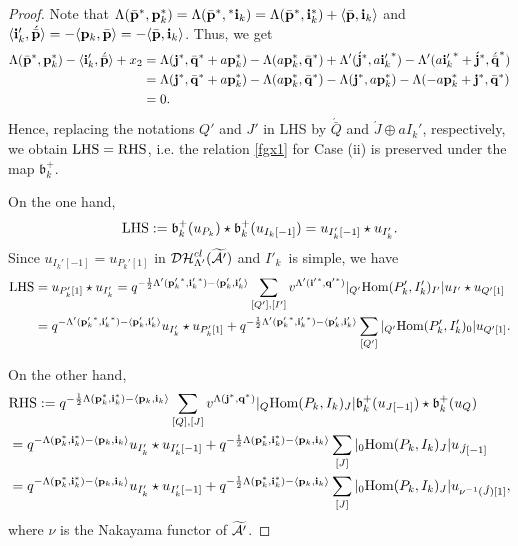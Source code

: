 \documentclass[reqno,12pt]{amsart}
\numberwithin{equation}{section}
\def\lr#1{\langle #1\rangle} \def\fin{\hfill$\square$}  \def\lra{\longrightarrow} \def\mod{\mbox{\rm \textbf{mod}}\,}\def\Mod{\mbox{\rm mod}\,}\def\top{\mbox{\rm top}\,}\def\soc{\mbox{\rm soc}\,}
\theoremstyle{plain} %
\theoremstyle{definition} %
\begin{document}
\begin{proof}
Note that $\Lambda(\bar{\bf p}^\ast, {\bf p}_k^\ast)=\Lambda(\bar{\bf p}^\ast, {^\ast}{\bf i}_k)=\Lambda(\bar{\bf p}^\ast, {\bf i}_k^\ast)+\langle \bar{\bf p},{\bf i}_k\rangle$ and $\langle {\bf i}_k',{\acute{\bar{\bf p}}}\rangle=-\langle {\bf p}_k,\bar{\bf p}\rangle=-\langle \bar{\bf p},{\bf i}_k\rangle$. Thus, we get
\begin{align*}\Lambda(\bar{\bf p}^\ast, {\bf p}_k^\ast)-\langle {\bf i}_k',{\acute{\bar{\bf p}}}\rangle+x_2&=\Lambda({\bf j}^\ast,\bar{\bf q}^\ast+a{\bf p}_k^\ast)-\Lambda(a{\bf p}_k^\ast,\bar{\bf q}^\ast)+\Lambda'({\acute{{\bf j}}}^\ast,a{{\bf i}_k'}^\ast)-\Lambda'(a{{\bf i}_k'}^\ast+{\acute{{\bf j}}}^\ast, {\acute{\bar{\bf q}}}^\ast)\\
&=\Lambda({\bf j}^\ast,\bar{\bf q}^\ast+a{\bf p}_k^\ast)-\Lambda(a{\bf p}_k^\ast,\bar{\bf q}^\ast)-\Lambda({\bf j}^\ast, a{\bf p}_k^\ast)-\Lambda(-a{\bf p}_k^\ast+{\bf j}^\ast,\bar{\bf q}^\ast)\\
	&=0.\end{align*}
Hence, replacing the notations $Q'$ and $J'$ in {\rm LHS} by $\acute{\bar{Q}}$ and $\acute{J}\oplus aI_k'$, respectively,
we obtain
${\rm LHS}={\rm RHS}$, i.e. the relation \eqref{fgx1} for Case (ii) is preserved under the map $\mathfrak{b}_k^+$.

 On the one hand,
$${\rm LHS}:=\mathfrak{b}_k^+(u_{P_k})\star \mathfrak{b}_k^+(u_{I_k[-1]})=u_{I'_k[-1]}\star u_{I_k'}.$$
Since $u_{I_k'[-1]}=u_{P_k'[1]}$ in $\mathcal{DH}_{\Lambda'}^{cl}(\widetilde{\mathcal{A}'})$ and $I'_k$~is simple, we have	
\begin{align*}
{\rm LHS}&=u_{P'_k[1]}\star u_{I_k'}	
=q^{-\frac{1}{2}\Lambda'({{\bf p}_k'}^\ast,{{\bf i}_k'}^\ast)-\lr{{\bf p}'_k,{\bf i}'_k}}
\sum\limits_{[Q'],[I']}v^{\Lambda'({{\bf i}'}^\ast,{{\bf q}'}^\ast)}|{}_{Q'}\Hom(P'_k,I'_k)_{I'}|u_{I'}\star u_{Q'[1]}\\
&=q^{-\Lambda'({{\bf p}_k'}^\ast,{{\bf i}_k'}^\ast)-\lr{{\bf p}'_k,{\bf i}'_k}}u_{I'_k}\star u_{P'_k[1]}+q^{-\frac{1}{2}\Lambda'({{\bf p}_k'}^\ast,{{\bf i}_k'}^\ast)-\lr{{\bf p}'_k,{\bf i}'_k}}
\sum\limits_{[Q']}|{}_{Q'}\Hom(P'_k,I'_k)_{0}|u_{Q'[1]}.
\end{align*}

On the other hand,
\begin{align*}
&{\rm RHS}:=q^{-\frac{1}{2}\Lambda({\bf p}_k^\ast,{\bf i}_k^\ast)-\lr{{\bf p}_k,{\bf i}_k}}
\sum\limits_{[Q],[J]}v^{\Lambda({{\bf j}}^\ast,{{\bf q}}^\ast)}|{}_{Q}\Hom(P_k,I_k)_{J}|\mathfrak{b}_k^+(u_{J[-1]})\star \mathfrak{b}_k^+(u_{Q})\\
&=q^{-\Lambda({\bf p}_k^\ast,{\bf i}_k^\ast)-\lr{{\bf p}_k,{\bf i}_k}}u_{I'_k}\star u_{I'_k[-1]}+
q^{-\frac{1}{2}\Lambda({\bf p}_k^\ast,{\bf i}_k^\ast)-\lr{{\bf p}_k,{\bf i}_k}}
\sum\limits_{[J]}|{}_{0}\Hom(P_k,I_k)_{J}|u_{\acute{J}[-1]}\\
&=q^{-\Lambda({\bf p}_k^\ast,{\bf i}_k^\ast)-\lr{{\bf p}_k,{\bf i}_k}}u_{I'_k}\star u_{I'_k[-1]}+
q^{-\frac{1}{2}\Lambda({\bf p}_k^\ast,{\bf i}_k^\ast)-\lr{{\bf p}_k,{\bf i}_k}}
\sum\limits_{[J]}|{}_{0}\Hom(P_k,I_k)_{J}|u_{\nu^{-1}(\acute{J})[1]},
\end{align*}
where $\nu$ is the Nakayama functor of $\widetilde{{\mathcal{A}'}}$.


\end{proof}
\end{document}
